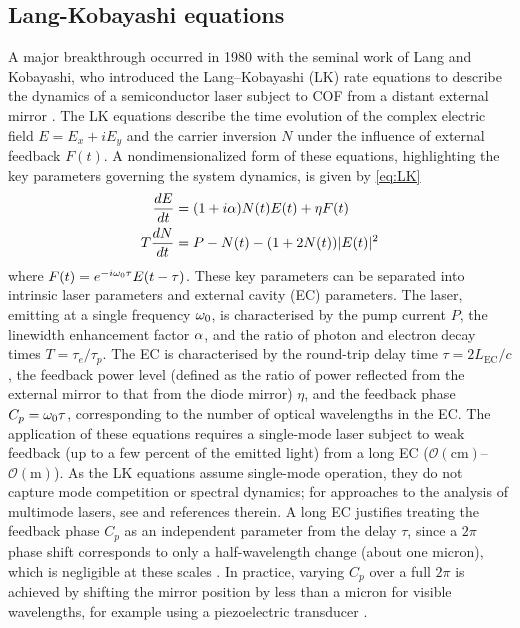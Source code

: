 \subsection{Lang-Kobayashi equations}
A major breakthrough occurred in 1980 with the seminal work of Lang and Kobayashi, who introduced the Lang–Kobayashi (LK) rate equations to describe the dynamics of a semiconductor laser subject to COF from a distant external mirror \cite{lang1980external}.
The LK equations describe the time evolution of the complex electric field $E = E_x + iE_y$ and the carrier inversion $N$ under the influence of external feedback $F(t)$.
A nondimensionalized form of these equations, highlighting the key parameters governing the system dynamics, is given by \eqref{eq:LK} \cite{heil2003delay}
%
\begin{equation}
\label{eq:LK}
    \begin{aligned}
        \frac{d E}{d t} & =(1+i \alpha) N(t) E(t)+\eta F(t) \\
        T \frac{d N}{d t} & =P-N(t)-(1+2 N(t))|E(t)|^2
    \end{aligned}
\end{equation}
%
where $F(t) = e^{-i\omega_0\tau} E(t-\tau)$. 
These key parameters can be separated into intrinsic laser parameters and external cavity (EC) parameters. 
The laser, emitting at a single frequency $\omega_0$, is characterised by the pump current $P$, the linewidth enhancement factor $\alpha$, and the ratio of photon and electron decay times $T = \tau_e/\tau_p$. 
The EC is characterised by the round-trip delay time $\tau = 2L_\text{EC}/c$, the feedback power level (defined as the ratio of power reflected from the external mirror to that from the diode mirror) $\eta$, and the feedback phase $C_p = \omega_0 \tau$, corresponding to the number of optical wavelengths in the EC.
The application of these equations requires a single-mode laser subject to weak feedback (up to a few percent of the emitted light) from a long EC ($\mathcal{O}(\text{cm})$–$\mathcal{O}(\text{m})$). 
As the LK equations assume single-mode operation, they do not capture mode competition or spectral dynamics; for approaches to the analysis of multimode lasers, see \cite{yacomotti2004dynamics} and references therein.
A long EC justifies treating the feedback phase $C_p$ as an independent parameter from the delay $\tau$, since a $2\pi$ phase shift corresponds to only a half-wavelength change (about one micron), which is negligible at these scales \cite{green2006mode}. 
In practice, varying $C_p$ over a full $2\pi$ is achieved by shifting the mirror position by less than a micron for visible wavelengths, for example using a piezoelectric transducer \cite{heil2003delay}.
